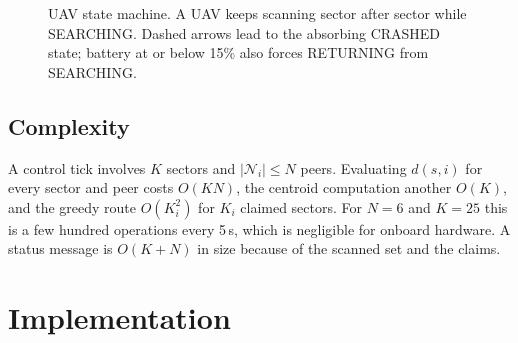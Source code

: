 \documentclass[10pt,letterpaper]{article}
\begin{document}
\begin{figure}[htbp]
\centering
{}
\caption{UAV state machine. A UAV keeps scanning sector after sector while SEARCHING. Dashed arrows lead to the absorbing CRASHED state; battery at or below 15\% also forces RETURNING from SEARCHING.}\label{fig:states}
\end{figure}

\subsection{Complexity}
A control tick involves $K$ sectors and $|\mathcal N_i|\le N$ peers. Evaluating $d(s,i)$ for every sector and peer costs $O(KN)$, the centroid computation another $O(K)$, and the greedy route $O(K_i^2)$ for $K_i$ claimed sectors. For $N=6$ and $K=25$ this is a few hundred operations every 5\,s, which is negligible for onboard hardware. A status message is $O(K+N)$ in size because of the scanned set and the claims.

\section{Implementation}\label{sec:impl}
\end{document}
